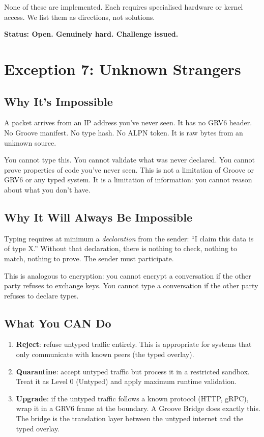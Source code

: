 \documentclass[11pt,a4paper]{article}
\begin{document}
None of these are implemented. Each requires specialised hardware or
kernel access. We list them as directions, not solutions.

\textbf{Status: Open. Genuinely hard. Challenge issued.}

\section{Exception 7: Unknown Strangers}
\label{sec:strangers}

\subsection{Why It's Impossible}

A packet arrives from an IP address you've never seen. It has no GRV6
header. No Groove manifest. No type hash. No ALPN token. It is raw
bytes from an unknown source.

You cannot type this. You cannot validate what was never declared. You
cannot prove properties of code you've never seen. This is not a
limitation of Groove or GRV6 or any typed system. It is a limitation of
information: you cannot reason about what you don't have.

\subsection{Why It Will Always Be Impossible}

Typing requires at minimum a \emph{declaration} from the sender: ``I
claim this data is of type X.'' Without that declaration, there is
nothing to check, nothing to match, nothing to prove. The sender must
participate.

This is analogous to encryption: you cannot encrypt a conversation
if the other party refuses to exchange keys. You cannot type a
conversation if the other party refuses to declare types.

\subsection{What You CAN Do}

\begin{enumerate}
\item \textbf{Reject}: refuse untyped traffic entirely. This is
  appropriate for systems that only communicate with known peers (the
  typed overlay).
\item \textbf{Quarantine}: accept untyped traffic but process it in a
  restricted sandbox. Treat it as Level 0 (Untyped) and apply maximum
  runtime validation.
\item \textbf{Upgrade}: if the untyped traffic follows a known protocol
  (HTTP, gRPC), wrap it in a GRV6 frame at the boundary. A Groove
  Bridge does exactly this. The bridge is the translation layer between
  the untyped internet and the typed overlay.
\end{enumerate}
\end{document}
